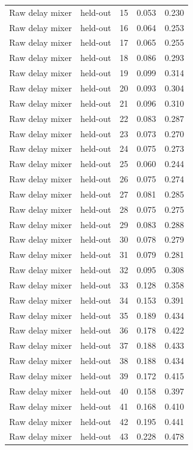 \begin{tabular}{llrrr}
Raw delay mixer & held-out & 15 & 0.053 & 0.230 \\
Raw delay mixer & held-out & 16 & 0.064 & 0.253 \\
Raw delay mixer & held-out & 17 & 0.065 & 0.255 \\
Raw delay mixer & held-out & 18 & 0.086 & 0.293 \\
Raw delay mixer & held-out & 19 & 0.099 & 0.314 \\
Raw delay mixer & held-out & 20 & 0.093 & 0.304 \\
Raw delay mixer & held-out & 21 & 0.096 & 0.310 \\
Raw delay mixer & held-out & 22 & 0.083 & 0.287 \\
Raw delay mixer & held-out & 23 & 0.073 & 0.270 \\
Raw delay mixer & held-out & 24 & 0.075 & 0.273 \\
Raw delay mixer & held-out & 25 & 0.060 & 0.244 \\
Raw delay mixer & held-out & 26 & 0.075 & 0.274 \\
Raw delay mixer & held-out & 27 & 0.081 & 0.285 \\
Raw delay mixer & held-out & 28 & 0.075 & 0.275 \\
Raw delay mixer & held-out & 29 & 0.083 & 0.288 \\
Raw delay mixer & held-out & 30 & 0.078 & 0.279 \\
Raw delay mixer & held-out & 31 & 0.079 & 0.281 \\
Raw delay mixer & held-out & 32 & 0.095 & 0.308 \\
Raw delay mixer & held-out & 33 & 0.128 & 0.358 \\
Raw delay mixer & held-out & 34 & 0.153 & 0.391 \\
Raw delay mixer & held-out & 35 & 0.189 & 0.434 \\
Raw delay mixer & held-out & 36 & 0.178 & 0.422 \\
Raw delay mixer & held-out & 37 & 0.188 & 0.433 \\
Raw delay mixer & held-out & 38 & 0.188 & 0.434 \\
Raw delay mixer & held-out & 39 & 0.172 & 0.415 \\
Raw delay mixer & held-out & 40 & 0.158 & 0.397 \\
Raw delay mixer & held-out & 41 & 0.168 & 0.410 \\
Raw delay mixer & held-out & 42 & 0.195 & 0.441 \\
Raw delay mixer & held-out & 43 & 0.228 & 0.478 \\

\end{tabular}
